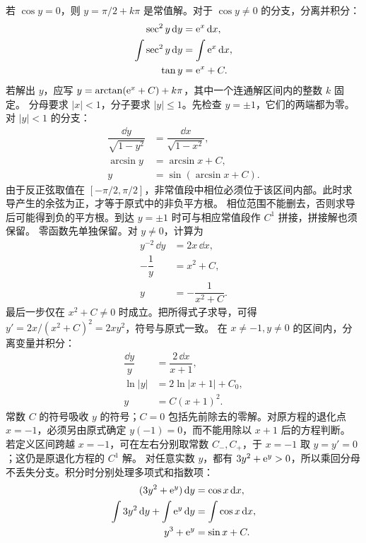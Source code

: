 若 $\cos y=0$，则 $y=\pi/2+k\pi$ 是常值解。对于 $\cos y\ne0$ 的分支，分离并积分：
\[
\begin{aligned}
\sec^2y\,\mathrm d y&=\mathrm e^x\,\mathrm d x,\\
\int\sec^2y\,\mathrm d y&=\int\mathrm e^x\,\mathrm d x,\\
\tan y&=\mathrm e^x+C.
\end{aligned}
\]
若解出 $y$，应写 $y=\arctan(\mathrm e^x+C)+k\pi$，其中一个连通解区间内的整数 $k$ 固定。
分母要求 $|x|<1$，分子要求 $|y|\le1$。先检查 $y=\pm1$，它们的两端都为零。对 $|y|<1$ 的分支：
\[
\begin{aligned}
\dfrac{\dd y}{\sqrt{1-y^2}}&=\dfrac{\dd x}{\sqrt{1-x^2}},\\
\arcsin y&=\arcsin x+C,\\
y&=\sin(\arcsin x+C).
\end{aligned}
\]
由于反正弦取值在 $[-\pi/2,\pi/2]$，非常值段中相位必须位于该区间内部。此时求导产生的余弦为正，才等于原式中的非负平方根。
相位范围不能删去，否则求导后可能得到负的平方根。到达 $y=\pm1$ 时可与相应常值段作 $C^1$ 拼接，拼接解也须保留。
零函数先单独保留。对 $y\ne0$，计算为
\[
\begin{aligned}
y^{-2}\,\dd y&=2x\,\dd x,\\
-\dfrac1y&=x^2+C,\\
y&=-\dfrac1{x^2+C}.
\end{aligned}
\]
最后一步仅在 $x^2+C\ne0$ 时成立。把所得式子求导，可得 $y'=2x/(x^2+C)^2=2xy^2$，符号与原式一致。
在 $x\ne-1,y\ne0$ 的区间内，分离变量并积分：
\[
\begin{aligned}
\dfrac{\dd y}{y}&=\dfrac{2\,\dd x}{x+1},\\
\ln|y|&=2\ln|x+1|+C_0,\\
y&=C(x+1)^2.
\end{aligned}
\]
常数 $C$ 的符号吸收 $y$ 的符号；$C=0$ 包括先前除去的零解。对原方程的退化点 $x=-1$，必须另由原式确定 $y(-1)=0$，而不能用除以 $x+1$ 后的方程判断。
若定义区间跨越 $x=-1$，可在左右分别取常数 $C_-,C_+$，于 $x=-1$ 取 $y=y'=0$；这仍是原退化方程的 $C^1$ 解。
对任意实数 $y$，都有 $3y^2+\mathrm e^y>0$，所以乘回分母不丢失分支。积分时分别处理多项式和指数项：
\[
\begin{aligned}
(3y^2+\mathrm e^y)\,\mathrm d y&=\cos x\,\mathrm d x,\\
\int3y^2\,\mathrm d y+\int\mathrm e^y\,\mathrm d y&=\int\cos x\,\mathrm d x,\\
y^3+\mathrm e^y&=\sin x+C.
\end{aligned}
\]
